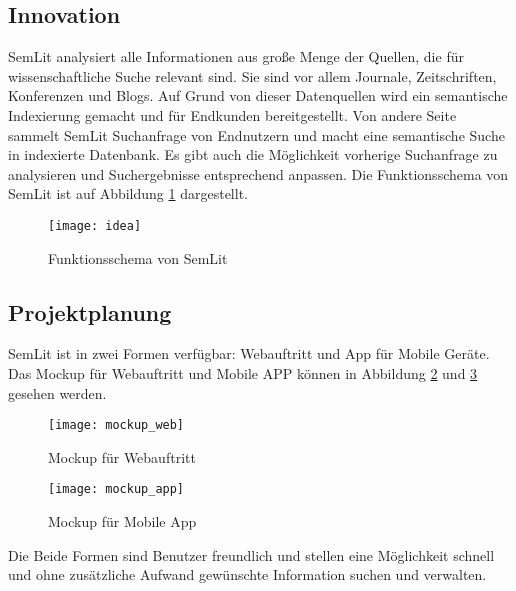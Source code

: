 \subsection{Innovation}

SemLit analysiert alle Informationen aus große Menge der Quellen, die für wissenschaftliche Suche relevant sind. Sie sind vor allem Journale, Zeitschriften, Konferenzen und Blogs. Auf Grund von dieser Datenquellen wird ein semantische Indexierung gemacht und für Endkunden bereitgestellt. Von andere Seite sammelt SemLit Suchanfrage von Endnutzern und macht eine semantische Suche in indexierte Datenbank. Es gibt auch die Möglichkeit vorherige Suchanfrage zu analysieren und Suchergebnisse entsprechend anpassen. Die Funktionsschema von SemLit ist auf Abbildung \ref{fig:idea} dargestellt.
\begin{figure}[h!]
\centering
\texttt{[image: idea]}
\caption{Funktionsschema von SemLit}
\label{fig:idea}
\end{figure}

\subsection{Projektplanung}

SemLit ist in zwei Formen verfügbar: Webauftritt und App für Mobile Geräte. Das Mockup für Webauftritt und Mobile APP können in Abbildung \ref{fig:web} und \ref{fig:app} gesehen werden.

\begin{figure}[h!]
\centering
\texttt{[image: mockup\_web]}
\caption{Mockup für Webauftritt}
\label{fig:web}
\end{figure}

\begin{figure}[h!]
\centering
\texttt{[image: mockup\_app]}
\caption{Mockup für Mobile App}
\label{fig:app}
\end{figure}

Die Beide Formen sind Benutzer freundlich und stellen eine Möglichkeit schnell und ohne zusätzliche Aufwand gewünschte Information suchen und verwalten.\\


